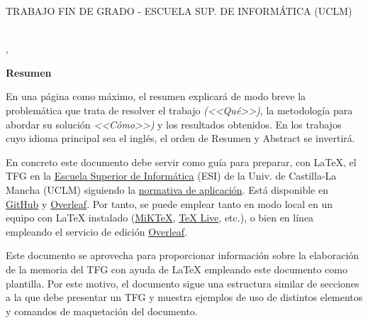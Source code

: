 \pagestyle{plain}	%

%
% 
%

\makeatletter
\begin{center} %
   {\textsc{TRABAJO FIN DE GRADO - ESCUELA SUP. DE INFORMÁTICA (UCLM)}\par} %
   \vspace{1cm} %
   {\textbf{\Large\@tituloCorto}\par}  %
   \vspace{0.4cm} %
   {\@autor \\ \@cityTF,{} \@mesTF{} \@yearTF\par} 
   \vspace{0.9cm} %
   {\textbf{\large\textsf{Resumen}}\par} %
\end{center}   
\makeatother %
En una página como máximo, el resumen explicará de modo breve la problemática que trata de resolver el trabajo \emph{(<<Qué>>)}, la metodología para  abordar su solución  \emph{<<Cómo>>)} y los resultados obtenidos. En los trabajos cuyo idioma principal sea el inglés, el orden de \textsf{Resumen} y \textsf{Abstract} se invertirá.

En concreto este documento debe servir como guía para preparar, con LaTeX, el TFG en la \href{http://webpub.esi.uclm.es/}{Escuela Superior de Informática} (ESI) de la Univ. de Castilla-La Mancha (UCLM) siguiendo la \href{https://pruebasaluuclm.sharepoint.com/sites/esicr/tfg/SitePages/Inicio.aspx}{normativa de aplicación}. Está disponible en \href{https://github.com/JesusSalido/TFG_ESI_UCLM}{GitHub} y \href{https://www.overleaf.com/latex/templates/plantilla-de-tfg-escuela-superior-de-informatica-uclm/phjgscmfqtsw}{Overleaf}. Por tanto, se puede emplear tanto en modo local en un equipo con LaTeX instalado (\href{https://miktex.org/}{MiKTeX}, \href{https://www.tug.org/texlive/}{TeX Live}, etc.), o bien en línea empleando el servicio de edición \href{https://www.overleaf.com/latex/templates/plantilla-de-tfg-escuela-superior-de-informatica-uclm/phjgscmfqtsw}{Overleaf}.

Este documento se aprovecha para proporcionar información sobre la elaboración de la memoria del TFG con ayuda de \LaTeX{} empleando este documento como plantilla. Por este motivo, el documento sigue una estructura similar de secciones a la que debe presentar un TFG y muestra ejemplos de uso de distintos elementos y comandos de maquetación del documento.

